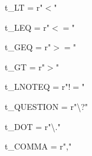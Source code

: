 t\_LT = r"$<$"
                                            
t\_LEQ = r"$<=$"
                                               
t\_GEQ = r"$>=$"
                                                 
t\_GT = r"$>$"
                                                   
t\_LNOTEQ = r"$!=$"
                                                     
t\_QUESTION = r"\textbackslash?"
                                                      
t\_DOT = r"\textbackslash."
                                                         
t\_COMMA = r","
                                                         
